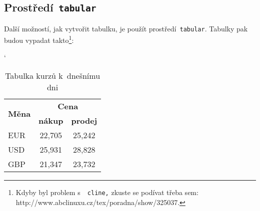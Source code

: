 \documentclass[a4paper, 11pt]{article}
\begin{document}
\subsection{Prostředí\texttt{ tabular}}

Další možností, jak vytvořit tabulku, je použít prostředí\texttt{ tabular}.
Tabulky pak budou vypadat takto\footnote{
	Kdyby byl problem s~\texttt{ cline,} zkuste se podívat třeba sem:
	http://www.abclinuxu.cz/tex/poradna/show/325037.
}:

\bigskip
\begin{table}[h!]
	\catcode`
	\centering
	\begin{tabular}{|l|c|c|}
		\hline
		\multirow{2}{*}{\textbf{Měna}} & \multicolumn{2}{|c|}{\textbf{Cena}}                   \\ \cline{2-3}
		                               & \textbf{nákup}                      & \textbf{prodej} \\
		\hline
		EUR                            & 22,705                              & 25,242          \\
		USD                            & 25,931                              & 28,828          \\
		GBP                            & 21,347                              & 23,732          \\
		\hline
	\end{tabular}
	\caption{Tabulka kurz\r{u} k~dnešnímu dni}
	\label{tab:kurz}
\end{table}
\end{document}
